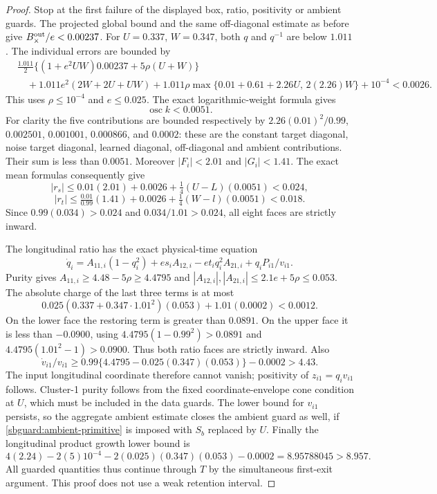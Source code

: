 \documentclass{article} %
\theoremstyle{plain}
\theoremstyle{definition}
\theoremstyle{remark}
\begin{document}
\begin{proof}
Stop at the first failure of the displayed box, ratio, positivity or
ambient guards. The projected global bound and the same off-diagonal
estimate as before give $B_\times^{\rm out}/e<0.00237$.
For $U=0.337$, $W=0.347$, both $q$ and $q^{-1}$ are below $1.011$.
The individual errors are bounded by
\[
 \begin{split}
 &\frac{1.011}{2}\{(1+e^2UW)0.00237+5\rho(U+W)\}\\
 &\quad+1.011e^2(2W+2U+UW)
        +1.011\rho\max\{0.01+0.61+2.26U,\,2(2.26)W\}
        +10^{-4}<0.0026.
 \end{split}
\]
This uses $\rho\le10^{-4}$ and $e\le0.025$.
The exact logarithmic-weight formula gives
\[
 \operatorname{osc} k<0.0051.
\]
For clarity the five contributions are bounded respectively by
$2.26(0.01)^2/0.99$, $0.002501$, $0.001001$, $0.000866$, and
$0.0002$: these are the constant target diagonal, noise target diagonal,
learned diagonal, off-diagonal and ambient contributions. Their sum is
less than $0.0051$. Moreover $|F_i|<2.01$ and $|G_i|<1.41$.
The exact mean formulas consequently give
\[
 |r_s|\le0.01(2.01)+0.0026+
              \tfrac14(U-L)(0.0051)<0.024,
\]
\[
 |r_t|\le\tfrac{0.01}{0.99}(1.41)+0.0026+
              \tfrac14(W-l)(0.0051)<0.018.
\]
Since $0.99(0.034)>0.024$ and $0.034/1.01>0.024$,
all eight faces are strictly inward.

The longitudinal ratio has the exact physical-time equation
\[
 \dot q_i=A_{11,i}(1-q_i^2)+e s_iA_{12,i}
                    -e t_i q_i^2 A_{21,i}+q_iP_{i1}/v_{i1}.
\]
Purity gives $A_{11,i}\ge4.48-5\rho\ge4.4795$ and
$|A_{12,i}|,|A_{21,i}|\le2.1e+5\rho\le0.053$.
The absolute charge of the last three terms is at most
\[
 0.025(0.337+0.347\cdot1.01^2)(0.053)+1.01(0.0002)<0.0012.
\]
On the lower face the restoring term is greater than $0.0891$.
On the upper face it is less than $-0.0900$, using
$4.4795(1-0.99^2)>0.0891$ and $4.4795(1.01^2-1)>0.0900$. Thus both ratio faces are strictly inward.
Also
\[
 \dot v_{i1}/v_{i1}
 \ge0.99\{4.4795-0.025(0.347)(0.053)\}-0.0002>4.43.
\]
The input longitudinal coordinate therefore cannot vanish; positivity
of $z_{i1}=q_iv_{i1}$ follows. Cluster-1 purity follows from the fixed
coordinate-envelope cone condition at $U$, which must be included in
the data guards. The lower bound for $v_{i1}$ persists, so the aggregate
ambient estimate closes the ambient guard as well, if
\eqref{sbguard:ambient-primitive} is imposed with $S_b$ replaced by $U$.
Finally the longitudinal product growth lower bound is
\[
 4(2.24)-2(5)10^{-4}
 -2(0.025)(0.347)(0.053)-0.0002
 =8.95788045>8.957.
\]
All guarded quantities thus continue through $T$ by the simultaneous
first-exit argument. This proof does not use a weak retention interval.
\end{proof}
\end{document}
